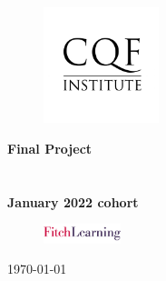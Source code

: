 \begin{titlepage}
    
    \begin{center}

        \begin{figure}[!htb]
            \centering
            \includegraphics[width=0.3\textwidth]{img/cqf_logo.png}
        \end{figure}
     
        \huge \textbf{Final Project}\\
        \vspace{0.5cm}
        \Large \textbf{\mytitle}\\
        \vspace{0.7cm}
        \large \textbf{\myself}\\
        \vspace{0.2cm}
        \textbf{January 2022 cohort}\\ 

        \mbox{}
        \vfill

        \begin{figure}[!htb]
            \centering
            \includegraphics[width=0.2\textwidth]{img/FitchLearning_logo.png}
        \end{figure}

        \today
    \end{center}

\afterpage{\blankpage}
\end{titlepage} 